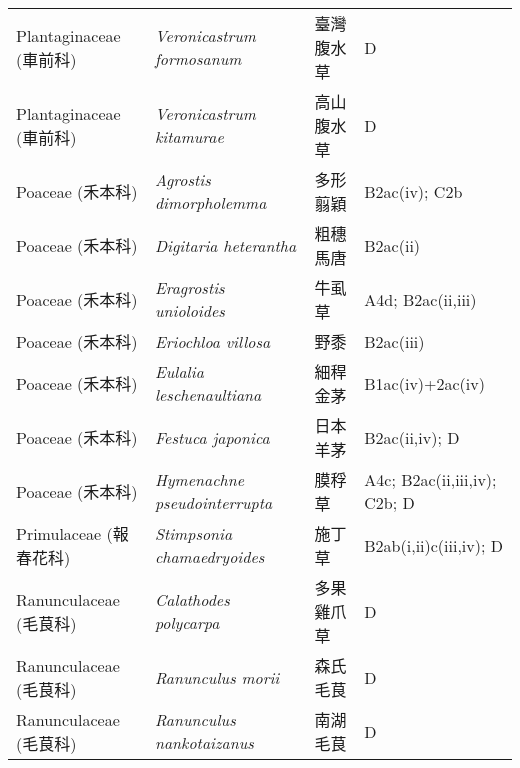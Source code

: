 \begin{longtable}{p{3cm}p{5cm}p{3cm}p{4cm}}
    Plantaginaceae (車前科) & \textit{Veronicastrum formosanum}  & 臺灣腹水草 & D \index{Veronicastrum@\textit{Veronicastrum}!formosanum@\textit{formosanum}}  \index{臺灣腹水草} \\
    Plantaginaceae (車前科) & \textit{Veronicastrum kitamurae}  & 高山腹水草 & D \index{Veronicastrum@\textit{Veronicastrum}!kitamurae@\textit{kitamurae}}  \index{高山腹水草} \\
    Poaceae (禾本科) & \textit{Agrostis dimorpholemma}  & 多形翦穎 & B2ac(iv); C2b \index{Agrostis@\textit{Agrostis}!dimorpholemma@\textit{dimorpholemma}}  \index{多形翦穎} \\
    Poaceae (禾本科) & \textit{Digitaria heterantha}  & 粗穗馬唐 & B2ac(ii) \index{Digitaria@\textit{Digitaria}!heterantha@\textit{heterantha}}  \index{粗穗馬唐} \\
    Poaceae (禾本科) & \textit{Eragrostis unioloides}  & 牛虱草 & A4d; B2ac(ii,iii) \index{Eragrostis@\textit{Eragrostis}!unioloides@\textit{unioloides}}  \index{牛虱草} \\
    Poaceae (禾本科) & \textit{Eriochloa villosa}  & 野黍 & B2ac(iii) \index{Eriochloa@\textit{Eriochloa}!villosa@\textit{villosa}}  \index{野黍} \\
    Poaceae (禾本科) & \textit{Eulalia leschenaultiana}  & 細稈金茅 & B1ac(iv)+2ac(iv) \index{Eulalia@\textit{Eulalia}!leschenaultiana@\textit{leschenaultiana}}  \index{細稈金茅} \\
    Poaceae (禾本科) & \textit{Festuca japonica}  & 日本羊茅 & B2ac(ii,iv); D \index{Festuca@\textit{Festuca}!japonica@\textit{japonica}}  \index{日本羊茅} \\
    Poaceae (禾本科) & \textit{Hymenachne pseudointerrupta}  & 膜稃草 & A4c; B2ac(ii,iii,iv); C2b; D \index{Hymenachne@\textit{Hymenachne}!pseudointerrupta@\textit{pseudointerrupta}}  \index{膜稃草} \\
    Primulaceae (報春花科) & \textit{Stimpsonia chamaedryoides}  & 施丁草 & B2ab(i,ii)c(iii,iv); D \index{Stimpsonia@\textit{Stimpsonia}!chamaedryoides@\textit{chamaedryoides}}  \index{施丁草} \\
    Ranunculaceae (毛茛科) & \textit{Calathodes polycarpa}  & 多果雞爪草 & D \index{Calathodes@\textit{Calathodes}!polycarpa@\textit{polycarpa}}  \index{多果雞爪草} \\
    Ranunculaceae (毛茛科) & \textit{Ranunculus morii}  & 森氏毛茛 & D \index{Ranunculus@\textit{Ranunculus}!morii@\textit{morii}}  \index{森氏毛茛} \\
    Ranunculaceae (毛茛科) & \textit{Ranunculus nankotaizanus}  & 南湖毛茛 & D \index{Ranunculus@\textit{Ranunculus}!nankotaizanus@\textit{nankotaizanus}}  \index{南湖毛茛} \\

\end{longtable}
